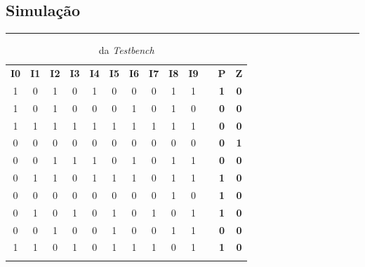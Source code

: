 \documentclass[12pt]{article}
\begin{document}
\subsection{Simulação}
\noindent\rule[1.2cm]{3.35in}{.1mm}
\vspace{-1cm}
\begin{table}[H]
\centering
\begin{tabular}{|c|c|c|c|c|c|c|c|c|c|l|c|c|}

\hhline{----------~--}
\rowcolor{lightgray} \textbf{I0} & \textbf{I1} & \textbf{I2} & \textbf{I3} & \textbf{I4} & \textbf{I5} & \textbf{I6} & \textbf{I7} & \textbf{I8} & \textbf{I9} & {\cellcolor{white}}  & \textbf{P} & \textbf{Z} \\ 

\hhline{----------~--}
1  & 0  & 1  & 0  & 1  & 0  & 0  & 0  & 1  & 1  &  & \cellcolor{green}\textbf{1} & \cellcolor{red}\textbf{0} \\ 

\hhline{----------~--}
1  & 0  & 1  & 0  & 0  & 0  & 1  & 0  & 1  & 0  &  & \cellcolor{red}\textbf{0} & \cellcolor{red}\textbf{0} \\ 

\hhline{----------~--}
1  & 1  & 1  & 1  & 1  & 1  & 1  & 1  & 1  & 1  &  & \cellcolor{red}\textbf{0} & \cellcolor{red}\textbf{0} \\ 

\hhline{----------~--}
0  & 0  & 0  & 0  & 0  & 0  & 0  & 0  & 0  & 0  &  & \cellcolor{red}\textbf{0} & \cellcolor{green}\textbf{1} \\ 

\hhline{----------~--}
\rowcolor{yellow} 0  & 0  & 1  & 1  & 1  & 0  & 1  & 0  & 1  & 1  & \cellcolor[HTML]{FFFFFF} &  \textbf{0} & \textbf{0} \\ 

\hhline{----------~--}
0  & 1  & 1  & 0  & 1  & 1  & 1  & 0  & 1  & 1  &  & \cellcolor{green}\textbf{1} & \cellcolor{red}\textbf{0} \\ 

\hhline{----------~--}
0  & 0  & 0  & 0  & 0  & 0  & 0  & 0  & 1  & 0  &  & \cellcolor{green}\textbf{1} & \cellcolor{red}\textbf{0} \\ 

\hhline{----------~--}
0  & 1  & 0  & 1  & 0  & 1  & 0  & 1  & 0  & 1  &  & \cellcolor{green}\textbf{1} & \cellcolor{red}\textbf{0} \\ 

\hhline{----------~--}
0  & 0  & 1  & 0  & 0  & 1  & 0  & 0  & 1  & 1  &  & \cellcolor{red}\textbf{0} & \cellcolor{red}\textbf{0} \\ 

\hhline{----------~--}
1  & 1  & 0  & 1  & 0  & 1  & 1  & 1  & 0  & 1  &  & \cellcolor{green}\textbf{1} & \cellcolor{red}\textbf{0} \\ 

\hhline{----------~--}
\end{tabular}
\caption{ da \textit{Testbench}}
\label{Tabela Simulação}
\end{table}
\end{document}
